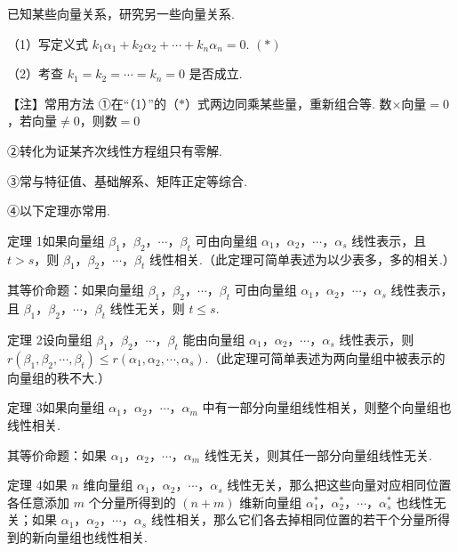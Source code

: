 




已知某些向量关系，研究另一些向量关系.

（1）写定义式 $k_1\alpha_1+k_2\alpha_2+\cdots+k_n\alpha_n=0$. \hfill $(*)$

（2）考查 $k_1=k_2=\cdots=k_n=0$ 是否成立.

\begin{fcard}{【注】常用方法}
①在“（1）”的（$*$）式两边同乘某些量，重新组合等. 数$\times$向量$=0$，若向量$\ne0$，则数$=0$

②转化为证某齐次线性方程组只有零解.

③常与特征值、基础解系、矩阵正定等综合.

④以下定理亦常用.

定理 1\quad 如果向量组 $\beta_1$，$\beta_2$，$\cdots$，$\beta_t$ 可由向量组 $\alpha_1$，$\alpha_2$，$\cdots$，$\alpha_s$ 线性表示，且 $t>s$，则 $\beta_1$，$\beta_2$，$\cdots$，$\beta_t$ 线性相关.（此定理可简单表述为以少表多，多的相关.）

其等价命题：如果向量组 $\beta_1$，$\beta_2$，$\cdots$，$\beta_t$ 可由向量组 $\alpha_1$，$\alpha_2$，$\cdots$，$\alpha_s$ 线性表示，且 $\beta_1$，$\beta_2$，$\cdots$，$\beta_t$ 线性无关，则 $t\le s$.

定理 2\quad 设向量组 $\beta_1$，$\beta_2$，$\cdots$，$\beta_t$ 能由向量组 $\alpha_1$，$\alpha_2$，$\cdots$，$\alpha_s$ 线性表示，则 $r(\beta_1,\beta_2,\cdots,\beta_t)\le r(\alpha_1,\alpha_2,\cdots,\alpha_s)$.（此定理可简单表述为两向量组中被表示的向量组的秩不大.）


定理 3\quad 如果向量组 $\alpha_1$，$\alpha_2$，$\cdots$，$\alpha_m$ 中有一部分向量组线性相关，则整个向量组也线性相关.

其等价命题：如果 $\alpha_1$，$\alpha_2$，$\cdots$，$\alpha_m$ 线性无关，则其任一部分向量组线性无关.

定理 4\quad 如果 $n$ 维向量组 $\alpha_1$，$\alpha_2$，$\cdots$，$\alpha_s$ 线性无关，那么把这些向量对应相同位置各任意添加 $m$ 个分量所得到的 $(n+m)$ 维新向量组 $\alpha_1^{*}$，$\alpha_2^{*}$，$\cdots$，$\alpha_s^{*}$ 也线性无关；如果 $\alpha_1$，$\alpha_2$，$\cdots$，$\alpha_s$ 线性相关，那么它们各去掉相同位置的若干个分量所得到的新向量组也线性相关.
\end{fcard}

